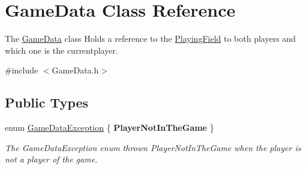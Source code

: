 \hypertarget{classGameData}{\section{Game\-Data Class Reference}
\label{classGameData}
}


The \hyperlink{classGameData}{Game\-Data} class Holds a reference to the \hyperlink{classPlayingField}{Playing\-Field} to both players and which one is the currentplayer.  




{\ttfamily \#include $<$Game\-Data.\-h$>$}

\subsection*{Public Types}
\begin{DoxyCompactItemize}
\item 
enum \hyperlink{classGameData_a2cbc881e9ac218f14694fed595c3c128}{Game\-Data\-Exception} \{ {\bfseries Player\-Not\-In\-The\-Game}
 \}
\begin{DoxyCompactList}\small\item\em The Game\-Data\-Exception enum thrown Player\-Not\-In\-The\-Game when the player is not a player of the game. \end{DoxyCompactList}\end{DoxyCompactItemize}
